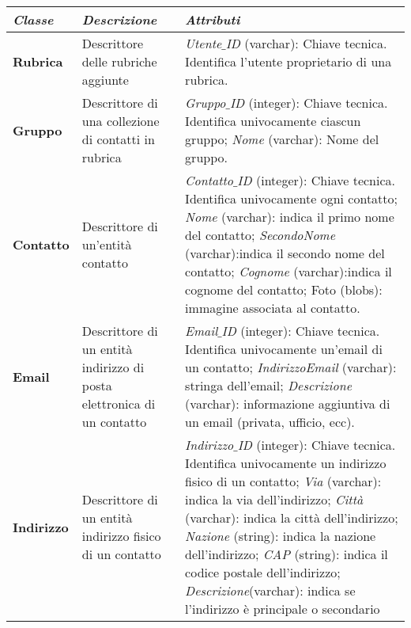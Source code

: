 \begin{longtable}{p{}p{}p{}}
\toprule
\textit{Classe} & \textit{Descrizione} & \textit{Attributi}
\\ \midrule
\endhead
\textbf{Rubrica} &
Descrittore delle rubriche aggiunte &
\textit{Utente$\_$ID} (varchar): Chiave tecnica. Identifica l’utente proprietario di una rubrica. 
\\ \midrule
\textbf{Gruppo} &
Descrittore di una collezione di contatti in rubrica &
\textit{Gruppo$\_$ID} (integer): Chiave tecnica. Identifica univocamente ciascun gruppo;\newline
\textit{Nome} (varchar): Nome del gruppo.
\\ \midrule
\textbf{Contatto} &
Descrittore di un'entità contatto &
\textit{Contatto$\_$ID} (integer): Chiave tecnica. Identifica univocamente ogni contatto;\newline
\textit{Nome} (varchar): indica il primo nome del contatto;\newline
\textit{SecondoNome} (varchar):indica il secondo nome del contatto;\newline
\textit{Cognome} (varchar):indica il cognome del contatto;\newline
Foto (blobs): immagine associata al contatto.
\\ \midrule
\textbf{Email} &
Descrittore di un entità indirizzo di posta elettronica di un contatto &
\textit{Email$\_$ID} (integer): Chiave tecnica. Identifica univocamente un'email di un contatto;\newline
\textit{IndirizzoEmail} (varchar): stringa dell'email;\newline
\textit{Descrizione} (varchar): informazione aggiuntiva di un email (privata, ufficio, ecc).
\\ \midrule
\textbf{Indirizzo} &
Descrittore di un entità indirizzo fisico di un contatto &
\textit{Indirizzo$\_$ID} (integer): Chiave tecnica. Identifica univocamente un indirizzo fisico di un contatto; \newline
\textit{Via} (varchar): indica la via dell’indirizzo;\newline
\textit{Città} (varchar): indica la città dell’indirizzo;\newline
\textit{Nazione} (string): indica la nazione dell’indirizzo;\newline
\textit{CAP} (string): indica il codice postale dell'indirizzo;\newline
\textit{Descrizione}(varchar): indica se l’indirizzo è principale o secondario

\end{longtable}

